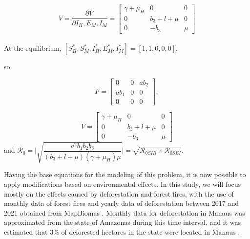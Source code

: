 \documentclass[a4paper,fleqn]{cas-dc}
\begin{document}
\begin{itemize}
$$ V = \dfrac{\partial{\mathcal V}}{\partial I_H, E_M, I_M} =%
\begin{bmatrix}
\gamma + \mu_H & 0 & 0\\
0 & b_3+l+\mu & 0\\
0 & -b_3 & \mu
\end{bmatrix}$$
\\At the equilibrium, $[S_H^*, S_M^*, I_H^*, E_M^*, I_M^*] = [1,1,0,0,0]$, 

so 

$$F=\begin{bmatrix}
0 & 0 & ab_2\\
ab_1 & 0 & 0\\
0 & 0 & 0
\end{bmatrix},$$

$$V = \begin{bmatrix}
\gamma + \mu_H & 0 & 0\\
0 & b_3+l+\mu & 0\\
0 & -b_3 & \mu
\end{bmatrix}$$ 
and $\mathcal{R}_0 = \Big | \sqrt{\dfrac{a^2 b_1 b_2 b_3}{(b_3 + l + \mu)(\gamma+\mu_H) \mu}}\Big | = 
\sqrt{\mathcal{R}_{0 SIR} \times \mathcal{R}_{0 SEI}}$. 
\end{itemize}

Having the base equations for the modeling of this problem, it is now possible to apply modifications based on environmental effects. In this study, we will focus mostly on the effects caused by deforestation and forest fires, with the use of monthly data of forest fires and yearly data of deforestation between 2017 and 2021 obtained from MapBiomas \cite{MapBIOMAS_Deforestation, MapBIOMAS_Forest_Fires}. Monthly data for deforestation in Manaus was approximated from the state of Amazonas during this time interval, and it was estimated that $3\%$ of deforested hectares in the state were located in Manaus \cite{DETER_Deforestation}.
\end{document}
